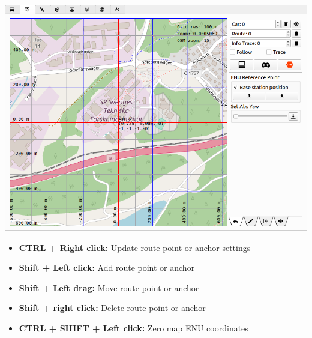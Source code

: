 \documentclass[12pt]{article} %
\begin{document}
\noindent\begin{minipage}{0.5\textwidth}
  \noindent \includegraphics[width=\textwidth]{./screens/map_car_control.png}
\end{minipage}
\noindent\begin{minipage}{0.5\textwidth}
\begin{itemize} 
  \item {\bf CTRL + Right click:} Update route point or anchor settings
  \item {\bf Shift + Left click:} Add route point or anchor
  \item {\bf Shift + Left drag:} Move route point or anchor
  \item {\bf Shift + right click:} Delete route point or anchor
  \item {\bf CTRL + SHIFT + Left click:} Zero map ENU coordinates
\end{itemize}
\end{minipage}
\end{document}
